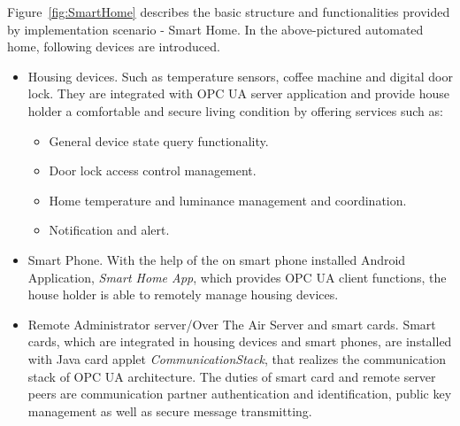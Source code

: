 Figure~\ref{fig:SmartHome} describes the basic structure and functionalities provided by implementation scenario  -  Smart Home. In the above-pictured automated home, following devices are introduced.
\begin{itemize}
\item Housing devices. Such as temperature sensors, coffee machine and digital door lock. They are integrated with OPC UA server application and provide house holder a comfortable and secure living condition by offering services such as:
\begin{itemize}
\item General device state query functionality.
\item Door lock access control management.
\item Home temperature and luminance management and coordination.
\item Notification and alert.
\end{itemize}
\item Smart Phone. With the help of the on smart phone installed  Android  Application, \emph{Smart Home App}, which provides OPC UA client functions, the house holder is able to remotely manage housing devices.
\item Remote Administrator server/Over The Air Server and smart cards. Smart cards, which are integrated in housing devices and smart phones, are installed with Java card applet \emph{CommunicationStack}, that realizes the communication stack of OPC UA architecture. The duties of smart card and remote server peers are  communication partner authentication and identification, public key management as well as  secure message transmitting.
\end{itemize}

